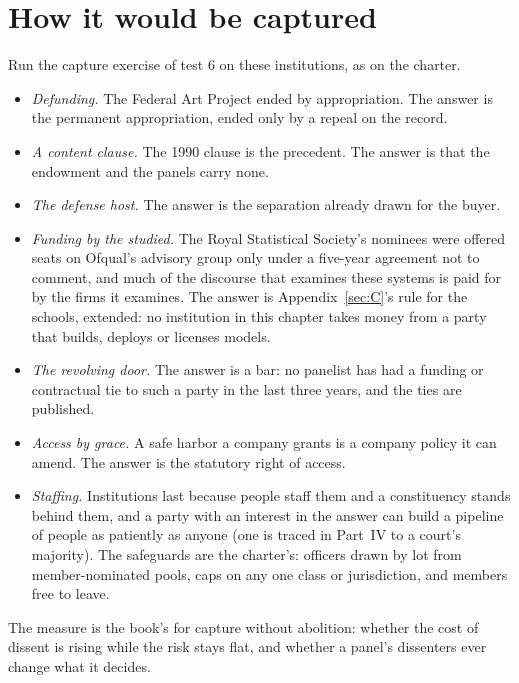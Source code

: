 \section{How it would be captured}
\label{sec:27.6}
Run the capture exercise of test 6 on these institutions, as on the charter.

\begin{itemize}
\item \emph{Defunding.} The Federal Art Project ended by appropriation. The answer is the permanent appropriation, ended only by a repeal on the record.
\item \emph{A content clause.} The 1990 clause is the precedent. The answer is that the endowment and the panels carry none.
\item \emph{The defense host.} The answer is the separation already drawn for the buyer.
\item \emph{Funding by the studied.} The Royal Statistical Society's nominees were offered seats on Ofqual's advisory group only under a five-year agreement not to comment, and much of the discourse that examines these systems is paid for by the firms it examines. The answer is Appendix~\ref{sec:C}'s rule for the schools, extended: no institution in this chapter takes money from a party that builds, deploys or licenses models.
\item \emph{The revolving door.} The answer is a bar: no panelist has had a funding or contractual tie to such a party in the last three years, and the ties are published.
\item \emph{Access by grace.} A safe harbor a company grants is a company policy it can amend. The answer is the statutory right of access.
\item \emph{Staffing.} Institutions last because people staff them and a constituency stands behind them, and a party with an interest in the answer can build a pipeline of people as patiently as anyone (one is traced in Part~IV to a court's majority). The safeguards are the charter's: officers drawn by lot from member-nominated pools, caps on any one class or jurisdiction, and members free to leave.
\end{itemize}

The measure is the book's for capture without abolition: whether the cost of dissent is rising while the risk stays flat, and whether a panel's dissenters ever change what it decides.
